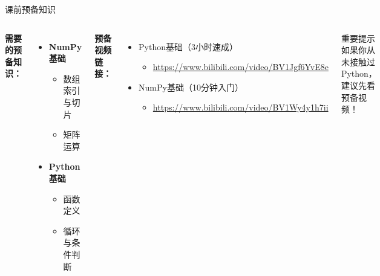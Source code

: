 \documentclass[aspectratio=169, 10pt]{beamer}
\institute{%
    \begin{minipage}{6cm}
        \centering
        \textbf{北京石油化工学院}\\
        \textit{人工智能研究院}
    \end{minipage}
}
\begin{document}
\begin{frame}
    \titlepage
\end{frame}

\begin{frame}{课前预备知识}
    \begin{columns}
        \textbf{需要的预备知识：}
        \begin{itemize}
            \item \textbf{NumPy基础}
            \begin{itemize}
                \item 数组索引与切片
                \item 矩阵运算
            \end{itemize}
            \item \textbf{Python基础}
            \begin{itemize}
                \item 函数定义
                \item 循环与条件判断
            \end{itemize}
        \end{itemize}

        \textbf{预备视频链接：}
        \begin{itemize}
            \item Python基础（3小时速成）
            \begin{itemize}
                \item \footnotesize \url{https://www.bilibili.com/video/BV1Jgf6YvE8e}
            \end{itemize}
            \item NumPy基础（10分钟入门）
            \begin{itemize}
                \item \footnotesize \url{https://www.bilibili.com/video/BV1Wy4y1h7ii}
            \end{itemize}
        \end{itemize}

        \vspace{0.5cm}
        \begin{alertblock}{重要提示}
            如果你从未接触过Python，建议先看预备视频！
        \end{alertblock}
    \end{columns}
\end{frame}
\end{document}
